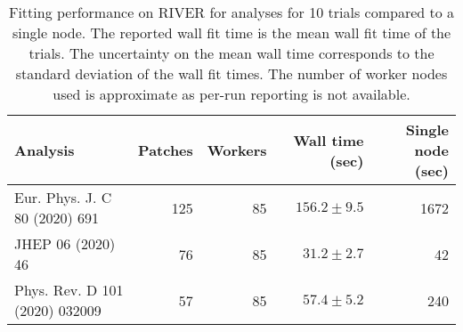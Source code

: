 \begin{table}[htpb]
\centering
\caption{Fitting performance on RIVER for analyses for 10 trials compared to a single node. The reported wall fit time is the mean wall fit time of the trials. The uncertainty on the mean wall time corresponds to the standard deviation of the wall fit times. The number of worker nodes used is approximate as per-run reporting is not available.}
\label{table:performance}
\begin{tabular}{@{}lrrrr@{}}
\toprule
                      Analysis & Patches & Workers & Wall time (sec) & Single node (sec) \\
\midrule
 Eur. Phys. J. C 80 (2020) 691 &     125 &      85 &   $156.2\pm9.5$ &              1672 \\
             JHEP 06 (2020) 46 &      76 &      85 &    $31.2\pm2.7$ &                42 \\
Phys. Rev. D 101 (2020) 032009 &      57 &      85 &    $57.4\pm5.2$ &               240 \\
\bottomrule
\end{tabular}
\end{table}
